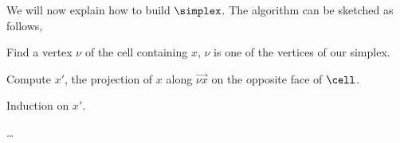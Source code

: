 We will now explain how to build $\simplex$. The algorithm can be sketched as
follows,

\begin{description}
\addtolength{\itemsep}{-0.5\baselineskip}
\item[1.$\;$] Find a vertex $\nu$ of the cell containing $x$, $\nu$ is one of
the vertices of our simplex.
\item[2.$\;$] Compute $x'$, the projection of $x$ along $\vec{\nu x}$ on the
opposite face of $\cell$.
\item[3.$\;$] Induction on $x'$.
\end{description}

\dots
